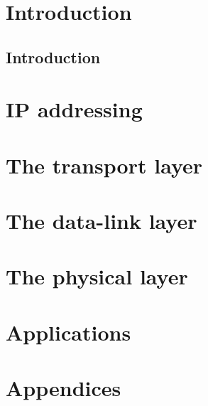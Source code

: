 \documentclass[b5paper,11pt]{memoir}
\begin{document}
\frontmatter
\tableofcontents
\clearforchapter\listoffigures
\clearforchapter\listoftables


\part{Introduction}
\chapter{Introduction}


\mainmatter
\part{IP addressing}















\part{The transport layer}
\label{part:transport-layer}

\part{The data-link layer}




\part{The physical layer}


\part{Applications}




\part{Appendices}
\appendix

\backmatter
\nocite{*}
\printbibliography
\end{document}
